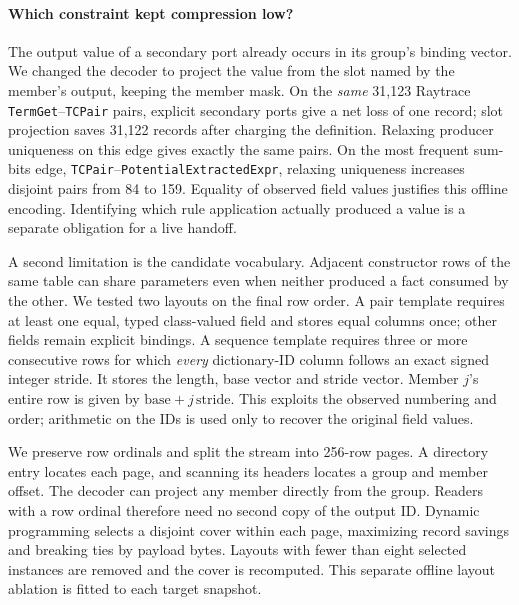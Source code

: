 \paragraph{Which constraint kept compression low?}
The output value of a secondary port already occurs in its group's binding vector. We changed the decoder to project the value from the slot named by the member's output, keeping the member mask. On the \emph{same} 31,123 Raytrace \texttt{TermGet}--\texttt{TCPair} pairs, explicit secondary ports give a net loss of one record; slot projection saves 31,122 records after charging the definition. Relaxing producer uniqueness on this edge gives exactly the same pairs. On the most frequent sum-bits edge, \texttt{TCPair}--\texttt{PotentialExtractedExpr}, relaxing uniqueness increases disjoint pairs from 84 to 159. Equality of observed field values justifies this offline encoding. Identifying which rule application actually produced a value is a separate obligation for a live handoff.

A second limitation is the candidate vocabulary. Adjacent constructor rows of the same table can share parameters even when neither produced a fact consumed by the other. We tested two layouts on the final row order. A pair template requires at least one equal, typed class-valued field and stores equal columns once; other fields remain explicit bindings. A sequence template requires three or more consecutive rows for which \emph{every} dictionary-ID column follows an exact signed integer stride. It stores the length, base vector and stride vector. Member \(j\)'s entire row is given by \(\mathrm{base}+j\,\mathrm{stride}\). This exploits the observed numbering and order; arithmetic on the IDs is used only to recover the original field values.

We preserve row ordinals and split the stream into 256-row pages. A directory entry locates each page, and scanning its headers locates a group and member offset. The decoder can project any member directly from the group. Readers with a row ordinal therefore need no second copy of the output ID. Dynamic programming selects a disjoint cover within each page, maximizing record savings and breaking ties by payload bytes. Layouts with fewer than eight selected instances are removed and the cover is recomputed. This separate offline layout ablation is fitted to each target snapshot.

